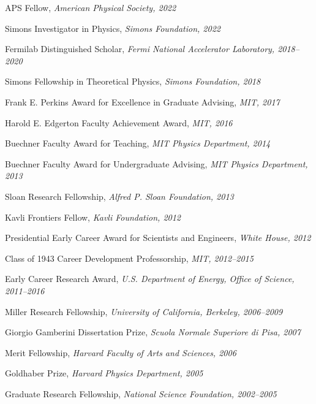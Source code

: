 \bbl
\item APS Fellow, \textit{American Physical Society, 2022}
\item Simons Investigator in Physics, \textit{Simons Foundation, 2022}
\item Fermilab Distinguished Scholar, \textit{Fermi National Accelerator Laboratory, 2018--2020}
\item Simons Fellowship in Theoretical Physics, \textit{Simons Foundation, 2018}
\item Frank E. Perkins Award for Excellence in Graduate Advising, \textit{MIT, 2017}
\item Harold E. Edgerton Faculty Achievement Award, \textit{MIT, 2016}
\item Buechner Faculty Award for Teaching, \textit{MIT Physics Department, 2014}
\item Buechner Faculty Award for Undergraduate Advising, \textit{MIT Physics Department, 2013}
\item Sloan Research Fellowship, \textit{Alfred P. Sloan Foundation, 2013}
\item Kavli Frontiers Fellow, \textit{Kavli Foundation, 2012}
\item Presidential Early Career Award for Scientists and Engineers, \textit{White House, 2012}
\item Class of 1943 Career Development Professorship, \textit{MIT, 2012--2015}
\item Early Career Research Award, \textit{U.S. Department of Energy, Office of Science, 2011--2016}
\item Miller Research Fellowship, \textit{University of California, Berkeley, 2006--2009}
\item Giorgio Gamberini Dissertation Prize, \textit{Scuola Normale Superiore di Pisa, 2007}
\item Merit Fellowship, \textit{Harvard Faculty of Arts and Sciences, 2006}
\item Goldhaber Prize, \textit{Harvard Physics Department, 2005}
\item Graduate Research Fellowship, \textit{National Science Foundation, 2002--2005}
\el
